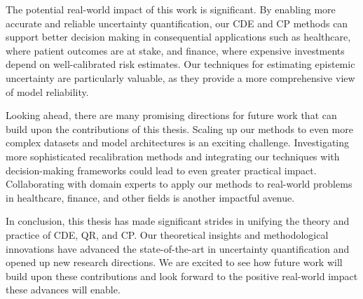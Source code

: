 The potential real-world impact of this work is significant. By enabling more accurate and reliable uncertainty quantification, our CDE and CP methods can support better decision making in consequential applications such as healthcare, where patient outcomes are at stake, and finance, where expensive investments depend on well-calibrated risk estimates. Our techniques for estimating epistemic uncertainty are particularly valuable, as they provide a more comprehensive view of model reliability.

Looking ahead, there are many promising directions for future work that can build upon the contributions of this thesis. Scaling up our methods to even more complex datasets and model architectures is an exciting challenge. Investigating more sophisticated recalibration methods and integrating our techniques with decision-making frameworks could lead to even greater practical impact. Collaborating with domain experts to apply our methods to real-world problems in healthcare, finance, and other fields is another impactful avenue.

In conclusion, this thesis has made significant strides in unifying the theory and practice of CDE, QR, and CP. Our theoretical insights and methodological innovations have advanced the state-of-the-art in uncertainty quantification and opened up new research directions. We are excited to see how future work will build upon these contributions and look forward to the positive real-world impact these advances will enable.